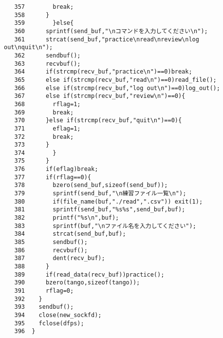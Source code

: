 \documentclass[a4j]{jarticle}
\begin{document}
{\begin{verbatim}
   357		  break;
   358		}
   359	      }else{
   360		sprintf(send_buf,"\nコマンドを入力してください\n");
   361		strcat(send_buf,"practice\nread\nreview\nlog out\nquit\n");
   362		sendbuf();
   363		recvbuf();
   364		if(strcmp(recv_buf,"practice\n")==0)break;
   365		else if(strcmp(recv_buf,"read\n")==0)read_file();
   366		else if(strcmp(recv_buf,"log out\n")==0)log_out();
   367		else if(strcmp(recv_buf,"review\n")==0){
   368		  rflag=1;
   369		  break;
   370		}else if(strcmp(recv_buf,"quit\n")==0){
   371		  eflag=1;
   372		  break;
   373		}
   374	      }
   375	    }
   376	    if(eflag)break;
   377	    if(rflag==0){
   378	      bzero(send_buf,sizeof(send_buf));
   379	      sprintf(send_buf,"\n練習ファイル一覧\n");
   380	      if(file_name(buf,"./read",".csv")) exit(1);
   381	      sprintf(send_buf,"%s%s",send_buf,buf);
   382	      printf("%s\n",buf);
   383	      sprintf(buf,"\nファイル名を入力してください");
   384	      strcat(send_buf,buf);
   385	      sendbuf();
   386	      recvbuf();
   387	      dent(recv_buf);
   388	    }
   389	    if(read_data(recv_buf))practice();
   390	    bzero(tango,sizeof(tango));
   391	    rflag=0;
   392	  }
   393	  sendbuf();
   394	  close(new_sockfd);
   395	  fclose(dfps);
   396	}  
\end{verbatim}
}
\end{document}
